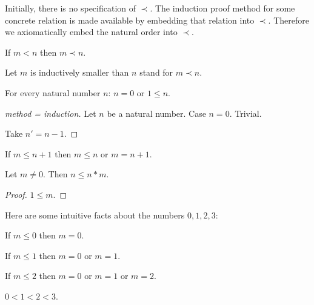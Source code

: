 \documentclass[11pt]{article}
\begin{document}
Initially, there is no specification of $\prec$.
The induction proof method for some concrete relation 
is made available by embedding that relation
into $\prec$. Therefore we axiomatically embed the natural
order into $\prec$.

\begin{forthel}
\begin{axiom}
If $m < n$ then $m \prec n$.
\end{axiom}

Let $m$ is inductively smaller than $n$ stand for $m \prec n$.

\end{forthel}

\begin{forthel}

\begin{lemma}
For every natural number $n$: $n = 0$ or $1 \leq n$.
\end{lemma}
\begin{proof}[method = induction]
Let $n$ be a natural number.
Case $n = 0$. Trivial.

Take $n' = n - 1$. 
\end{proof}

\begin{lemma}
If $m \leq n+1$ then $m \leq n$ or $m = n+1$.
\end{lemma}


\begin{lemma}
Let $m \neq 0$. Then $n \leq n * m$.
\end{lemma}
\begin{proof}
$1 \leq m$.
\end{proof}
\end{forthel}

Here are some intuitive facts about the numbers $0,1,2,3$:

\begin{forthel}
\begin{lemma}
If $m \leq 0$ then $m = 0$.
\end{lemma}

\begin{lemma}
If $m \leq 1$ then $m = 0$ or $m = 1$.
\end{lemma}

\begin{lemma}
If $m \leq 2$ then $m = 0$ or $m = 1$ or $m = 2$.
\end{lemma}

\begin{lemma}
$0 < 1 < 2 < 3$.
\end{lemma}

\end{forthel}
\end{document}
